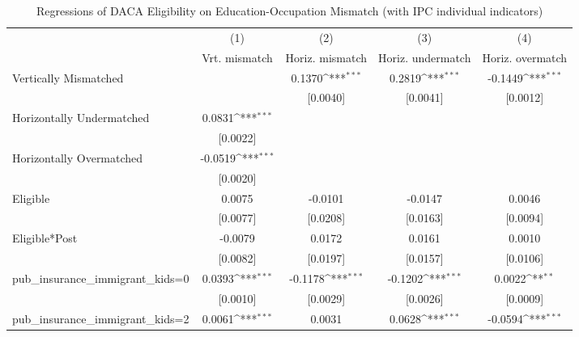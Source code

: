 \begin{table}[htbp]\centering
\def\sym#1{\ifmmode^{#1}\else\(^{#1}\)\fi}
\caption{Regressions of DACA Eligibility on Education-Occupation Mismatch (with IPC individual indicators)}
\begin{tabular}{l*{4}{c}}
\toprule
                    &\multicolumn{1}{c}{(1)}         &\multicolumn{1}{c}{(2)}         &\multicolumn{1}{c}{(3)}         &\multicolumn{1}{c}{(4)}         \\
                    &Vrt. mismatch         &Horiz. mismatch         &Horiz. undermatch         &Horiz. overmatch         \\
\midrule
Vertically Mismatched&                     &      0.1370\sym{***}&      0.2819\sym{***}&     -0.1449\sym{***}\\
                    &                     &    [0.0040]         &    [0.0041]         &    [0.0012]         \\
\addlinespace
Horizontally Undermatched&      0.0831\sym{***}&                     &                     &                     \\
                    &    [0.0022]         &                     &                     &                     \\
\addlinespace
Horizontally Overmatched&     -0.0519\sym{***}&                     &                     &                     \\
                    &    [0.0020]         &                     &                     &                     \\
\addlinespace
Eligible            &      0.0075         &     -0.0101         &     -0.0147         &      0.0046         \\
                    &    [0.0077]         &    [0.0208]         &    [0.0163]         &    [0.0094]         \\
\addlinespace
Eligible*Post       &     -0.0079         &      0.0172         &      0.0161         &      0.0010         \\
                    &    [0.0082]         &    [0.0197]         &    [0.0157]         &    [0.0106]         \\
\addlinespace
pub\_insurance\_immigrant\_kids=0&      0.0393\sym{***}&     -0.1178\sym{***}&     -0.1202\sym{***}&      0.0022\sym{**} \\
                    &    [0.0010]         &    [0.0029]         &    [0.0026]         &    [0.0009]         \\
\addlinespace
pub\_insurance\_immigrant\_kids=2&      0.0061\sym{***}&      0.0031         &      0.0628\sym{***}&     -0.0594\sym{***}\\

\end{tabular}
\end{table}

